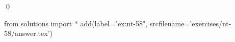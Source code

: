 
\begin{ex} 
  \label{ex:nt-58}
  
  \qed
\end{ex} 
\begin{python0}
from solutions import *
add(label="ex:nt-58",
    srcfilename='exercises/nt-58/answer.tex') 
\end{python0}
